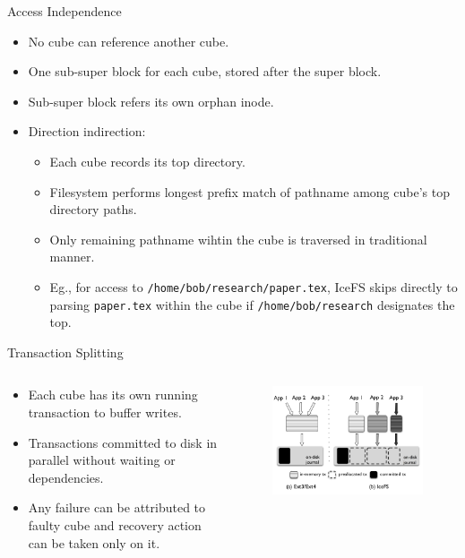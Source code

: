 \documentclass[aspectratio=169]{beamer}
\newcommand{\bi}{\begin{itemize}}
\newcommand{\ei}{\end{itemize}}
\begin{document}
\begin{frame}{Access Independence}
    \bi
\item No cube can reference another cube.
\item One sub-super block for each cube, stored after the super block.
\item Sub-super block refers its own orphan inode.
\item Direction indirection:
    \bi
\item Each cube records its top directory.
\item Filesystem performs longest prefix match of pathname among cube's top
    directory paths.
\item Only remaining pathname wihtin the cube is traversed in traditional
    manner.
\item Eg., for access to \texttt{/home/bob/research/paper.tex}, IceFS skips
    directly to parsing \texttt{paper.tex} within the cube if
    \texttt{/home/bob/research} designates the top.
    \ei
    \ei
\end{frame}

\begin{frame}{Transaction Splitting}
    \begin{columns}[T]
        \begin{column}{0.5\textwidth}
            \bi
        \item Each cube has its own running transaction to buffer writes.
        \item Transactions committed to disk in parallel without waiting or
            dependencies.
        \item Any failure can be attributed to faulty cube and recovery action can be
            taken only on it.
            \ei
        \end{column}
        \pause
        \hspace{-2cm}\begin{column}{0.2\textwidth}
            \begin{figure}
                \includegraphics[scale=0.3]{./figures/fig7.png}
            \end{figure}
        \end{column}
    \end{columns}
\end{frame}
\end{document}
